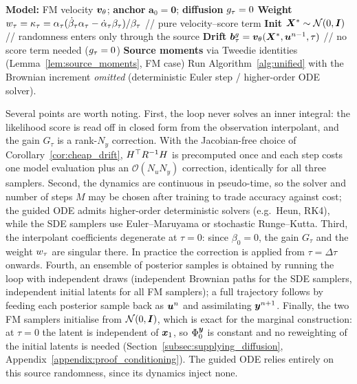 \begin{algorithm}[ht]
\caption{Sampler 3 -- Guided probability-flow ODE (flow matching, deterministic)}
\label{alg:fm_ode}
\begin{algorithmic}[1]
\STATE \textbf{Model:} FM velocity $\bm{v}_\theta$; \textbf{anchor} $\bm a_0=\bm 0$; \textbf{diffusion} $g_\tau=0$
\STATE \textbf{Weight} $w_\tau = \kappa_\tau = \alpha_\tau(\dot\beta_\tau\alpha_\tau-\dot\alpha_\tau\beta_\tau)/\beta_\tau$ \hfill // pure velocity--score term
\STATE \textbf{Init} $\boldsymbol{X}^{*}\sim\mathcal{N}(0,\bm{I})$ \hfill // randomness enters only through the source
\STATE \textbf{Drift} $\bm{b}^{g}_\tau=\bm{v}_\theta(\boldsymbol{X}^{*},\boldsymbol{u}^{n-1},\tau)$ \hfill // no score term needed ($g_\tau=0$)
\STATE \textbf{Source moments} via Tweedie identities (Lemma~\ref{lem:source_moments}, FM case)
\STATE Run Algorithm~\ref{alg:unified} with the Brownian increment \emph{omitted} (deterministic Euler step / higher-order ODE solver).
\end{algorithmic}
\end{algorithm}

Several points are worth noting. First, the loop never solves an inner integral: the likelihood score is read off in closed form from the observation interpolant, and the gain $G_\tau$ is a rank-$N_y$ correction. With the Jacobian-free choice of Corollary~\ref{cor:cheap_drift}, $H^\top R^{-1}H$ is precomputed once and each step costs one model evaluation plus an $\mathcal{O}(N_u N_y)$ correction, identically for all three samplers. Second, the dynamics are continuous in pseudo-time, so the solver and number of steps $M$ may be chosen after training to trade accuracy against cost; the guided ODE admits higher-order deterministic solvers (e.g.\ Heun, RK4), while the SDE samplers use Euler--Maruyama or stochastic Runge--Kutta. Third, the interpolant coefficients degenerate at $\tau=0$: since $\beta_0=0$, the gain $G_\tau$ and the weight $w_\tau$ are singular there. In practice the correction is applied from $\tau=\Delta\tau$ onwards. Fourth, an ensemble of posterior samples is obtained by running the loop with independent draws (independent Brownian paths for the SDE samplers, independent initial latents for all FM samplers); a full trajectory follows by feeding each posterior sample back as $\boldsymbol{u}^{n}$ and assimilating $\boldsymbol{y}^{n+1}$. Finally, the two FM samplers initialise from $\mathcal{N}(0,\bm{I})$, which is exact for the marginal construction: at $\tau=0$ the latent is independent of $\boldsymbol{x}_1$, so $\Phi_0^{\boldsymbol{y}}$ is constant and no reweighting of the initial latents is needed (Section~\ref{subsec:supplying_diffusion}, Appendix~\ref{appendix:proof_conditioning}). The guided ODE relies entirely on this source randomness, since its dynamics inject none.

